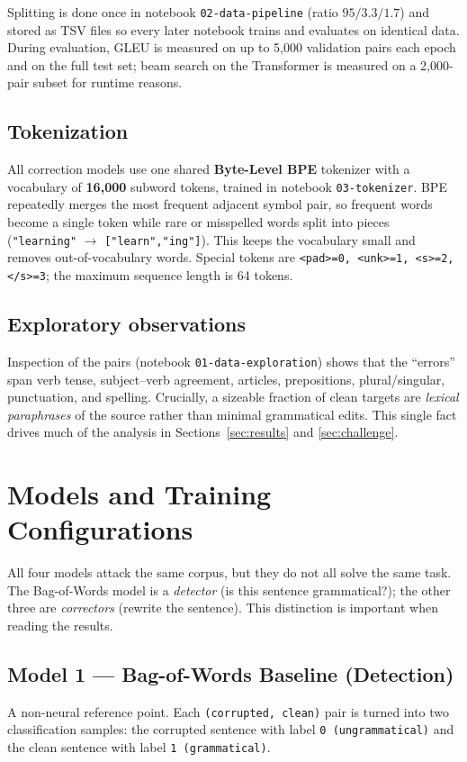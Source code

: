 \documentclass[11pt,a4paper]{article}
\begin{document}
Splitting is done once in notebook \texttt{02-data-pipeline} (ratio
$95/3.3/1.7$) and stored as TSV files so every later notebook trains and
evaluates on identical data. During evaluation, GLEU is measured on up to 5{,}000
validation pairs each epoch and on the full test set; beam search on the
Transformer is measured on a 2{,}000-pair subset for runtime reasons.

\subsection{Tokenization}
All correction models use one shared \textbf{Byte-Level BPE} tokenizer with a
vocabulary of \textbf{16{,}000} subword tokens, trained in notebook
\texttt{03-tokenizer}. BPE repeatedly merges the most frequent adjacent symbol
pair, so frequent words become a single token while rare or misspelled words
split into pieces (\texttt{"learning"} $\rightarrow$ \texttt{["learn","ing"]}).
This keeps the vocabulary small and removes out-of-vocabulary words. Special
tokens are \texttt{<pad>=0, <unk>=1, <s>=2, </s>=3}; the maximum sequence length
is 64 tokens.

\subsection{Exploratory observations}
Inspection of the pairs (notebook \texttt{01-data-exploration}) shows that the
``errors'' span verb tense, subject--verb agreement, articles, prepositions,
plural/singular, punctuation, and spelling. Crucially, a sizeable fraction of
clean targets are \emph{lexical paraphrases} of the source rather than minimal
grammatical edits. This single fact drives much of the analysis in
Sections~\ref{sec:results} and \ref{sec:challenge}.

\section{Models and Training Configurations}
All four models attack the same corpus, but they do not all solve the same task.
The Bag-of-Words model is a \emph{detector} (is this sentence grammatical?); the
other three are \emph{correctors} (rewrite the sentence). This distinction is
important when reading the results.

\subsection{Model 1 --- Bag-of-Words Baseline (Detection)}
A non-neural reference point. Each \texttt{(corrupted, clean)} pair is turned
into two classification samples: the corrupted sentence with label
\texttt{0 (ungrammatical)} and the clean sentence with label
\texttt{1 (grammatical)}.
\end{document}
